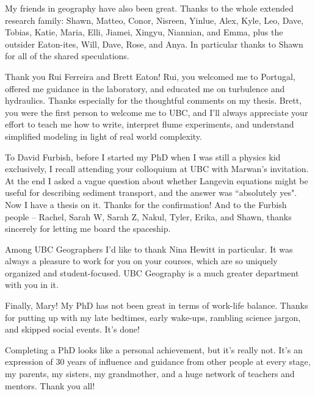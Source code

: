 My friends in geography have also been great. Thanks to the whole extended research family: Shawn, Matteo, Conor, Nisreen, Yinlue, Alex, Kyle, Leo, Dave, Tobias, Katie, Maria, Elli, Jiamei, Xingyu, Niannian, and Emma, plus the outsider Eaton-ites, Will, Dave, Rose, and Anya. In particular thanks to Shawn for all of the shared speculations.

Thank you Rui Ferreira and Brett Eaton!
Rui, you welcomed me to Portugal, offered me guidance in the laboratory, and educated me on turbulence and hydraulics. Thanks especially for the thoughtful comments on my thesis.
Brett, you were the first person to welcome me to UBC, and I'll always appreciate your effort to teach me how to write, interpret flume experiments, and understand simplified modeling in light of real world complexity. 

To David Furbish, before I started my PhD when I was still a physics kid exclusively, I recall attending your colloquium at UBC with Marwan's invitation. At the end I asked a vague question about whether Langevin equations might be useful for describing sediment transport, and the answer was ``absolutely yes". Now I have a thesis on it. Thanks for the confirmation! And to the Furbish people -- Rachel, Sarah W, Sarah Z, Nakul, Tyler, Erika, and Shawn, thanks sincerely for letting me board the spaceship.

Among UBC Geographers I'd like to thank Nina Hewitt in particular. It was always a pleasure to work for you on your courses, which are so uniquely organized and student-focused. UBC Geography is a much greater department with you in it.

Finally, Mary! My PhD has not been great in terms of work-life balance. Thanks for putting up with my late bedtimes, early wake-ups, rambling science jargon, and skipped social events. It's done!

Completing a PhD looks like a personal achievement, but it's really not.
It's an expression of 30 years of influence and guidance from other people at every stage, my parents, my sisters, my grandmother, and a huge network of teachers and mentors. Thank you all!
